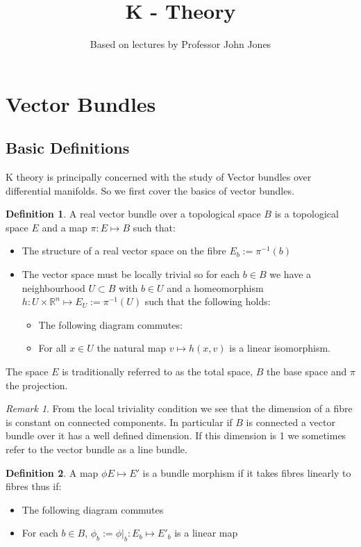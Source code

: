 \documentclass[a4paper,10pt]{article}
\title{K - Theory}
\author{Based on lectures by Professor John Jones}
\theoremstyle{plain}%
\theoremstyle{definition}
\newtheorem{defn}{Definition}
\theoremstyle{remark}
\newtheorem{rem}{Remark}
\begin{document}
\maketitle

\section{Vector Bundles}

\subsection{Basic Definitions}

K theory is principally concerned with the study of Vector bundles over differential manifolds. So we first cover the basics of vector bundles. 

\begin{defn}
 A real vector bundle over a topological space $B$ is a topological space $E$ and a map $\pi:E\mapsto B$ such that:
 \begin{itemize}
  \item The structure of a real vector space on the fibre $E_b:=\pi^{-1}(b)$
  \item The vector space must be locally trivial so for each $b\in B$ we have a neighbourhood $U\subset B$ 
with $b\in U$ and a homeomorphism $h:U\times \mathbb{R}^n\mapsto E_U := \pi^{-1}(U)$ such that the following holds:
  \begin{itemize}
   \item The following diagram commutes:
   \item For all $x\in U$ the natural map $v\mapsto h(x,v)$ is a linear isomorphism.
  \end{itemize}
 \end{itemize}
\end{defn}

The space $E$ is traditionally referred to as the total space, $B$ the base space and $\pi$ the projection.

\begin{rem}
 From the local triviality condition we see that the dimension of a fibre is constant on connected components.
In particular if $B$ is connected a vector bundle over it has a well defined dimension. If this dimension is 1
we sometimes refer to the vector bundle as a line bundle.
\end{rem}


\begin{defn}
 A map $\phi E\mapsto E'$ is a bundle morphism if it takes fibres linearly to fibres thus if:
  \begin{itemize}
   \item The following diagram commutes
   \item For each $b \in B$, $\phi_b:=\phi|_b :E_b \mapsto E'_b$ is a linear map
  \end{itemize}
\end{defn}
\end{document}
